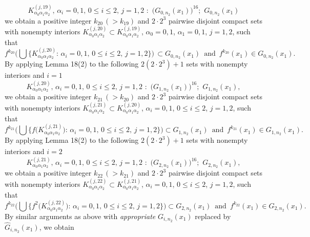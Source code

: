 \documentclass[12pt]{article}
\newcommand{\al}{\alpha}
\begin{document}
$$
K_{\al_0\al_1\al_2}^{(j,19)}, \, \al_i = 0, 1, \, 0 \le i \le 2, \, j = 1, 2 \,\, : \,\, \big(G_{0,n_2}(x_1)\big)^{16}; \,\, G_{0,n_2}(x_1)
$$
we obtain a positive integer $k_{20} \, (> k_{19})$ and $2 \cdot 2^3$ pairwise disjoint compact sets with nonempty interiors $K_{\al_0\al_1\al_2}^{(j,20)} \subset K_{\al_0\al_1\al_2}^{(j,19)}$, $\al_0 = 0, 1$, $\al_1 = 0, 1$, $j = 1, 2$, such that 
$$
f^{k_{20}}\bigg(\bigcup \big\{ K_{\al_0\al_1\al_2}^{(j,20)}: \, \al_i = 0, 1, \, 0 \le i \le 2, \, j = 1, 2 \big\}\bigg) \, \subset G_{0,n_2}(x_1) \,\,\, \text{and} \,\,\, f^{k_{20}}(x_1) \in G_{0,n_2}(x_1).
$$
\indent By applying Lemma 18(2) to the following $2(2 \cdot 2^3)+1$ sets with nonempty interiors and $i = 1$
$$
K_{\al_0\al_1\al_2}^{(j,20)}, \, \al_i = 0, 1, \, 0 \le i \le 2, \, j = 1, 2 \,\, : \,\, \big(G_{1,n_2}(x_1)\big)^{16}; \,\, G_{1,n_2}(x_1),
$$
we obtain a positive integer $k_{21} \, (> k_{20})$ and $2 \cdot 2^3$ pairwise disjoint compact sets with nonempty interiors $K_{\al_0\al_1\al_2}^{(j,21)} \subset K_{\al_0\al_1\al_2}^{(j,20)}$, $\al_i = 0, 1$, $0 \le i \le 2$, $j = 1, 2$, such that 
$$
f^{k_{21}}\bigg(\bigcup \big\{ f\big(K_{\al_0\al_1\al_2}^{(j,21)}\big): \, \al_i = 0, 1, \, 0 \le i \le 2, \, j = 1, 2 \big\}\bigg) \subset G_{1,n_2}(x_1) \,\,\, \text{and} \,\,\, f^{k_{21}}(x_1) \in G_{1,n_2}(x_1).
$$
\indent By applying Lemma 18(2) to the following $2(2 \cdot 2^3)+1$ sets with nonempty interiors and $i = 2$
$$
K_{\al_0\al_1\al_2}^{(j,21)}, \, \al_i = 0, 1, \, 0 \le i \le 2, \, j = 1, 2 \,\, : \,\, \big(G_{2,n_2}(x_1)\big)^{16}; \,\, G_{2,n_2}(x_1),
$$
we obtain a positive integer $k_{22} \, (> k_{21})$ and $2 \cdot 2^3$ pairwise disjoint compact sets with nonempty interiors $K_{\al_0\al_1\al_2}^{(j,22)} \subset K_{\al_0\al_1\al_2}^{(j,21)}$, $\al_i = 0, 1$, $0 \le i \le 2$, $j = 1, 2$, such that 
$$
f^{k_{22}}\bigg(\bigcup \big\{ f^2\big(K_{\al_0\al_1\al_2}^{(j,22)}\big): \, \al_i = 0, 1, \, 0 \le i \le 2, \, j = 1, 2 \big\}\bigg) \subset G_{2,n_2}(x_1) \,\,\, \text{and} \,\,\, f^{k_{22}}(x_1) \in G_{2,n_2}(x_1).
$$
\indent By similar arguments as above with {\it appropriate} $G_{i,n_2}(x_1)$ replaced by $\widehat G_{i,n_2}(x_1)$, we obtain
\end{document}
